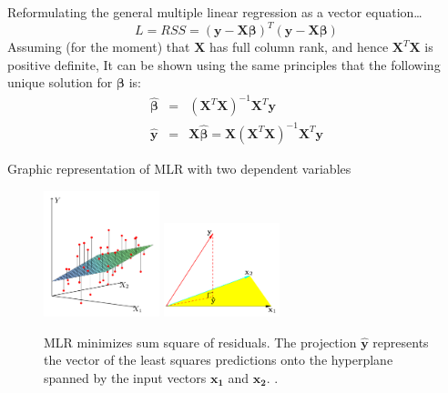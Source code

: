 \documentclass[aspectratio=169]{beamer}
\let \vec \mathbf
\begin{document}
\begin{frame}{Reformulating the general multiple linear regression as a vector equation…}
    \begin{equation*}
        L = RSS = (\vec{y} - \vec{X}\bm{\beta})^T(\vec{y} - \vec{X}\bm{\beta})
    \end{equation*}
    Assuming (for the moment) that $\vec{X}$ has full column rank, and hence $\vec{X}^T\vec{X}$ is positive definite, It can be shown using the same principles that the following unique solution for $\bm{\beta}$ is:
    \begin{eqnarray*}
        \hat{\bm{\beta}} &=& (\vec{X}^T \vec{X})^{-1} \vec{X}^T \vec{y} \\
        \hat{\vec{y}} & = & \vec{X} \hat{\bm{\beta}} = \vec{X}(\vec{X}^T \vec{X})^{-1} \vec{X}^T \vec{y} 
    \end{eqnarray*}
\end{frame}


\begin{frame}{Graphic representation of MLR with two dependent variables}
    \begin{figure}
        \centering
        \includegraphics[width=0.3\textwidth]{figures/fig3-1.pdf}
        \includegraphics[width=0.3\textwidth]{figures/fig3-2.pdf}
        \caption{MLR minimizes sum square of residuals. The projection $\vec{\hat{y}}$ represents the vector of the least squares predictions onto the hyperplane spanned by the input vectors $\vec{x_1}$ and $\vec{x_2}$. \cite{hastieElementsStatisticalLearning2016}.}
    \end{figure}
\end{frame}
\end{document}
